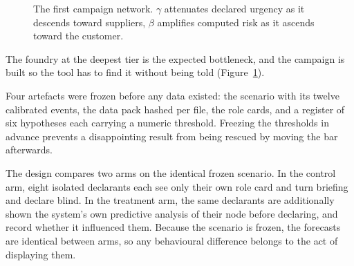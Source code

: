 \begin{figure}[H]
\caption[The first campaign network and its per-arc coefficients]{The first campaign network.
$\gamma$ attenuates declared urgency as it descends toward suppliers, $\beta$ amplifies
computed risk as it ascends toward the customer.}
\label{fig:reseau}
\end{figure}

The foundry at the deepest tier is the expected bottleneck, and the campaign is built so the
tool has to find it without being told (Figure~\ref{fig:reseau}).

Four artefacts were frozen before any data existed: the scenario with its twelve calibrated
events, the data pack hashed per file, the role cards, and a register of six hypotheses each
carrying a numeric threshold. Freezing the thresholds in advance prevents a disappointing
result from being rescued by moving the bar afterwards.

The design compares two arms on the identical frozen scenario. In the control arm, eight
isolated declarants each see only their own role card and turn briefing and declare blind. In
the treatment arm, the same declarants are additionally shown the system's own predictive
analysis of their node before declaring, and record whether it influenced them. Because the
scenario is frozen, the forecasts are identical between arms, so any behavioural difference
belongs to the act of displaying them.

